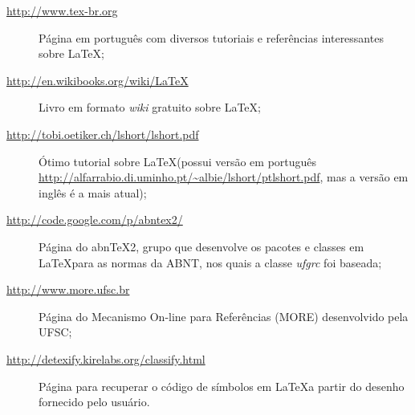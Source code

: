\begin{description}
 \item[\url{http://www.tex-br.org}] Página em português com diversos tutoriais e referências interessantes sobre \LaTeX;
 \item[\url{http://en.wikibooks.org/wiki/LaTeX}] Livro em formato \textit{wiki} gratuito sobre \LaTeX;
 \item[\url{http://tobi.oetiker.ch/lshort/lshort.pdf}] Ótimo tutorial sobre \LaTeX (possui versão em português \url{http://alfarrabio.di.uminho.pt/~albie/lshort/ptlshort.pdf}, mas a versão em inglês é a mais atual);
 \item[\url{http://code.google.com/p/abntex2/}] Página do abnTeX2, grupo que desenvolve os pacotes e classes em \LaTeX para as normas da ABNT, nos quais a classe \textit{ufgrc} foi baseada;
\item[\url{http://www.more.ufsc.br}] Página do Mecanismo On-line para Referências  (MORE) desenvolvido pela UFSC;
\item[\url{http://detexify.kirelabs.org/classify.html}] Página para recuperar o código de símbolos em \LaTeX a partir do desenho fornecido pelo usuário.
 \end{description}